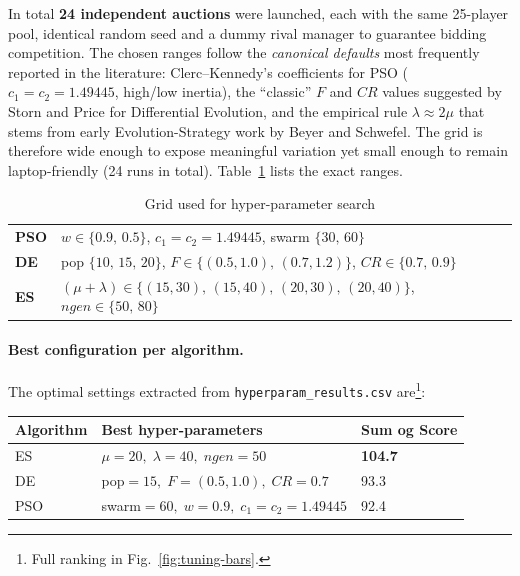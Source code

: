 \documentclass[sigconf]{acmart}
\begin{document}
	In total \textbf{24 independent auctions} were launched, each with the
	same 25-player pool, identical random seed and a dummy rival manager to
	guarantee bidding competition.  The chosen ranges follow the \emph{canonical defaults} most frequently
	reported in the literature: Clerc–Kennedy’s coefficients for PSO
	($c_1{=}c_2{=}1.49445$, high/low inertia),
	the “classic” $F$ and $CR$ values suggested by Storn and Price for
	Differential Evolution, and the empirical rule
	$\lambda \approx 2\mu$ that stems from early Evolution-Strategy work
	by Beyer and Schwefel.  
	The grid is therefore wide enough to expose meaningful variation yet
	small enough to remain laptop-friendly (24 runs in total).
	Table~\ref{tab:tuning-grid} lists the
	exact ranges.
	
	\begin{table}[H]
		\centering
		\caption{Grid used for hyper-parameter search}
		\label{tab:tuning-grid}
		\begin{tabular}{@{}l l@{}}
			\toprule
			\textbf{PSO} & $w\!\in\!\{0.9,\,0.5\}$,\;
			$c_{1}{=}c_{2}{=}1.49445$,\;
			swarm $\{30,\,60\}$ \\[2pt]
			\textbf{DE}  & pop $\{10,\,15,\,20\}$,\;
			$F\!\in\!\{(0.5,1.0),\,(0.7,1.2)\}$,\;
			$CR\!\in\!\{0.7,\,0.9\}$ \\[2pt]
			\textbf{ES}  & $(\mu+\lambda)\!\in\!\{(15,30),\,(15,40),\,(20,30),\,(20,40)\}$,\;
			$ngen\!\in\!\{50,\,80\}$ \\
			\bottomrule
		\end{tabular}
	\end{table}
	
	\paragraph{Best configuration per algorithm.}
	The optimal settings extracted from \texttt{hyperparam\_results.csv}
	are\footnote{Full ranking in Fig.~\ref{fig:tuning-bars}.}:
	
	\begin{center}
		\begin{tabular}{@{}lll@{}}
			\toprule
			\textbf{Algorithm} & \textbf{Best hyper-parameters} & \textbf{Sum og Score} \\
			\midrule
			ES  & $\mu=20,\;\lambda=40,\;ngen=50$          & \textbf{104.7} \\
			DE  & pop$=15,\;F=(0.5,1.0),\;CR=0.7$          & 93.3 \\
			PSO & swarm$=60,\;w=0.9,\;c_{1}=c_{2}=1.49445$ & 92.4 \\
			\bottomrule
		\end{tabular}
	\end{center}
	
\end{document}
